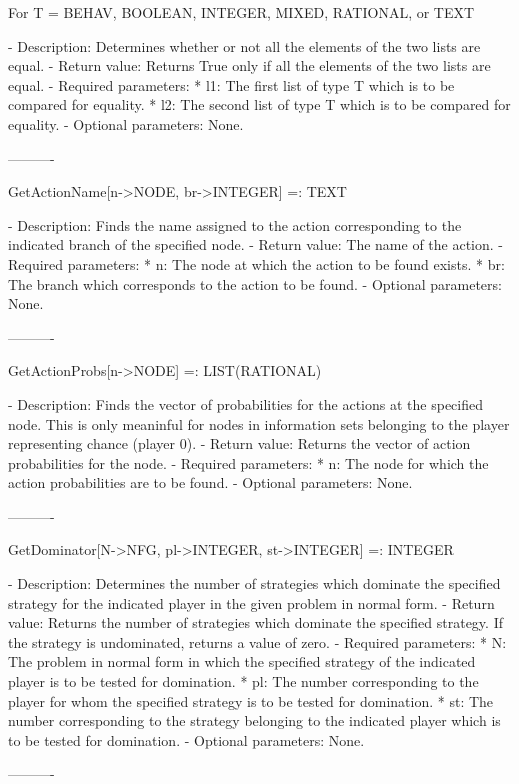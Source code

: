 {	For T = BEHAV, BOOLEAN, INTEGER, MIXED, RATIONAL, or TEXT

   -	Description:  Determines whether or not all the elements of the two
	lists are equal.
   -	Return value:  Returns True only if all the elements of the two lists
	are equal.
   -	Required parameters:  
	  *  l1:  The first list of type T which is to be compared for 
		equality.
	  *  l2:  The second list of type T which is to be compared for 
		equality.
   -	Optional parameters:  None.

----------

GetActionName[n->NODE, br->INTEGER] =: TEXT

   -	Description:  Finds the name assigned to the action corresponding to 
	the indicated branch of the specified node.
   -	Return value:  The name of the action.
   -	Required parameters:
	  *  n:  The node at which the action to be found exists.
	  *  br:  The branch which corresponds to the action to be found.
   -	Optional parameters:  None.

----------

GetActionProbs[n->NODE] =: LIST(RATIONAL)

   -	Description:  Finds the vector of probabilities for the actions at the
	specified node.  This is only meaninful for nodes in information sets 
	belonging to the player representing chance (player 0).
   -	Return value:  Returns the vector of action probabilities for the node.
   -	Required parameters: 
	  *  n:  The node for which the action probabilities are to be found.
   -	Optional parameters:  None.

----------

GetDominator[N->NFG, pl->INTEGER, st->INTEGER] =: INTEGER

   -	Description:  Determines the number of strategies which dominate the
	specified strategy for the indicated player in the given problem in 
	normal form.
   -	Return value:  Returns the number of strategies which dominate the
	specified strategy.  If the strategy is undominated, returns a value of
	zero.  
   -	Required parameters:
	  *  N:  The problem in normal form in which the specified strategy of
		the indicated player is to be tested for domination.
	  *  pl:  The number corresponding to the player for whom the specified
		strategy is to be tested for domination.
	  *  st:  The number corresponding to the strategy belonging to the 
		indicated player which is to be tested for domination.
   -	Optional parameters:  None.

----------

}
